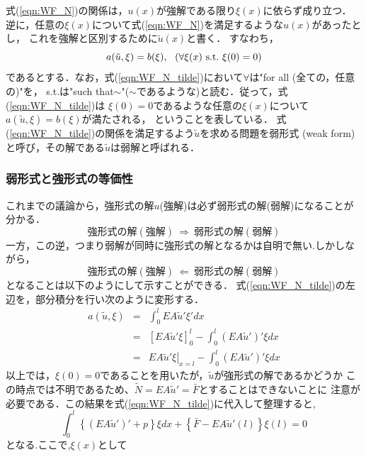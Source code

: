 \documentclass[10pt,a4j]{jarticle}
\begin{document}
式(\ref{eqn:WF_N})の関係は，$u(x)$が強解である限り$\xi(x)$に依らず成り立つ．
逆に，任意の$\xi(x)$について式(\ref{eqn:WF_N})を満足するような$u(x)$があったとし，
これを強解と区別するために$\tilde u(x)$と書く．
すなわち，
\begin{equation}
	a(\tilde u,\xi)=b(\xi), \ \ (\forall \xi(x) \ {\rm s.t.} \ \xi(0)=0)
	\label{eqn:WF_N_tilde}
\end{equation}
であるとする．なお，式(\ref{eqn:WF_N_tilde})において$\forall$は"for all (全ての，任意の)"を，
s.t.は"such that$\sim$"($\sim$であるような)と読む．従って，式(\ref{eqn:WF_N_tilde})は
$\xi(0)=0$であるような任意の$\xi(x)$について$a(\tilde u, \xi)=b(\xi)$が満たされる，
ということを表している．
式(\ref{eqn:WF_N_tilde})の関係を満足するよう$\tilde u$を求める問題を弱形式
(weak form)と呼び，その解である$\tilde u$は弱解と呼ばれる．
\subsubsection{弱形式と強形式の等価性}
これまでの議論から，強形式の解$u$(強解)は必ず弱形式の解(弱解)になることが分かる．
\begin{equation}
	強形式の解(強解) \ \Rightarrow \ 弱形式の解(弱解)
	\label{eqn:}
\end{equation}
一方，この逆，つまり弱解が同時に強形式の解となるかは自明で無い.しかしながら，
\begin{equation}
	強形式の解(強解) \ \Leftarrow \ 弱形式の解(弱解)
	\label{eqn:}
\end{equation}
となることは以下のようにして示すことができる．
式(\ref{eqn:WF_N_tilde})の左辺を，部分積分を行い次のように変形する．
\begin{eqnarray}
	a(\tilde u, \xi) 
	&=& 
	\int_0^l EA\tilde u' \xi'dx \nonumber \\
	&=& 
	\left[ 
		EA \tilde u'\xi 
	\right]_0^l - \int_0^l (EA\tilde u')'\xi dx
	\nonumber \\
	&=&
	\left. EA \tilde u'\xi \right|_{x=l} - \int_0^l (EA\tilde u')'\xi dx
	\label{eqn:}
\end{eqnarray}
以上では，$\xi(0)=0$であることを用いたが，$\tilde u$が強形式の解であるかどうか
この時点では不明であるため、$\tilde N = EA\tilde u'=\bar F$とすることはできないことに
注意が必要である．この結果を式(\ref{eqn:WF_N_tilde})に代入して整理すると,
\begin{equation}
	\int_0^l \left\{ (EA\tilde u')'+p \right\} \xi dx 
	+ \left\{ \bar F-EA\tilde u'(l) \right\}\xi(l)=0
	\label{eqn:w2s_proof}
\end{equation}
となる.ここで,$\xi(x)$として
\end{document}
